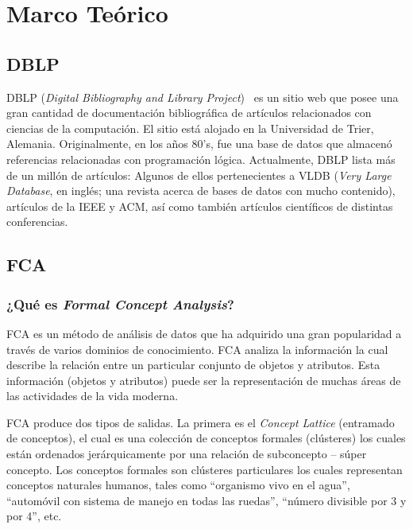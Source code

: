 \documentclass[12pt,oneside,letterpaper]{book}
\newcommand{\eng}[1]{\textit{#1}\xspace}			%
\newcommand{\abr}[1]{\textsc{#1}\xspace}           %
\theoremstyle{definition}
\begin{document}
\chapter{Marco Teórico}
\label{chap:marco_teorico}
\section{\abr{DBLP}}
\label{sec:dblp}
\abr{DBLP} (\eng{Digital Bibliography and Library Project})~\cite{DBLPLey2002} es un sitio web que posee una gran cantidad de documentación bibliográfica de artículos relacionados con ciencias de la computación. El sitio está alojado en la Universidad de Trier, Alemania. Originalmente, en los años 80's, fue una base de datos que almacenó referencias relacionadas con programación lógica. Actualmente, DBLP lista más de un millón de artículos: Algunos de ellos pertenecientes a \abr{VLDB} (\eng{Very Large Database}, en inglés; una revista acerca de bases de datos con mucho contenido), artículos de la \abr{IEEE} y \abr{ACM}, así como también artículos científicos de distintas conferencias.

\section{FCA}
\label{sec:fca}
\subsection{¿Qué es \eng{Formal Concept Analysis}?}
\label{sub:que_es_formal_concept_analysis}
\abr{FCA} es un método de análisis de datos que ha adquirido una gran popularidad a través de varios dominios de conocimiento.  \abr{FCA} analiza la información la cual describe la relación entre un particular conjunto de objetos y atributos. Esta información (objetos y atributos) puede ser la representación de muchas áreas de las actividades de la vida moderna.

\abr{FCA} produce dos tipos de salidas. La primera es el \eng{Concept Lattice} (entramado de conceptos), el cual es una colección de conceptos formales (clústeres) los cuales están ordenados jerárquicamente por una relación de subconcepto – súper concepto. Los conceptos formales son clústeres particulares los cuales representan conceptos naturales humanos, tales como ``organismo vivo en el agua'',  ``automóvil con sistema de manejo en todas las ruedas'', ``número divisible por 3 y por 4'', etc.
\end{document}
